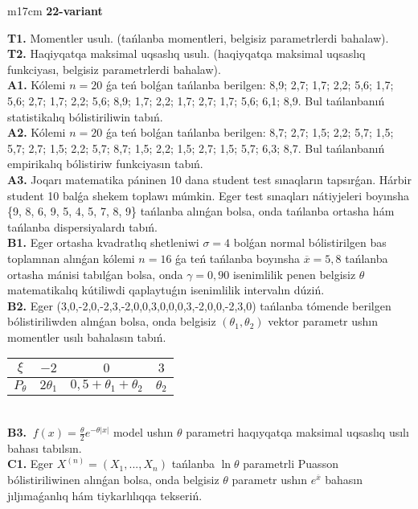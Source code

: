 \documentclass{article}
\begin{document}
\begin{tabular}{m{17cm}}
\textbf{22-variant}
\newline

\textbf{T1.} 
Momentler usulı. (tańlanba momentleri, belgisiz parametrlerdi bahalaw).
 \\
\textbf{T2.} 
Haqiyqatqa maksimal uqsaslıq usulı. (haqiyqatqa maksimal uqsaslıq funkciyası, belgisiz parametrlerdi bahalaw).
 \\
\textbf{A1.} 
Kólemi \(n = 20\) ǵa teń bolǵan tańlanba berilgen: 8,9; 2,7; 1,7; 2,2; 5,6; 1,7; 5,6; 2,7; 1,7; 2,2; 5,6; 8,9; 1,7; 2,2; 1,7; 2,7; 1,7; 5,6; 6,1; 8,9. Bul tańlanbanıń statistikalıq bólistiriliwin tabıń.
 \\
\textbf{A2.} 
Kólemi \(n = 20\) ǵa teń bolǵan tańlanba berilgen: 8,7; 2,7; 1,5; 2,2; 5,7; 1,5; 5,7; 2,7; 1,5; 2,2; 5,7; 8,7; 1,5; 2,2; 1,5; 2,7; 1,5; 5,7; 6,3; 8,7. Bul tańlanbanıń empirikalıq bólistiriw funkciyasın tabıń.
 \\
\textbf{A3.} 
Joqarı matematika páninen 10 dana student test sınaqların tapsırǵan. Hárbir student 10 balǵa shekem toplawı múmkin. Eger test sınaqları nátiyjeleri boyınsha \{9, 8, 6, 9, 5, 4, 5, 7, 8, 9\} tańlanba alınǵan bolsa, onda tańlanba ortasha hám tańlanba dispersiyalardı tabıń.
 \\
\textbf{B1.} 
Eger ortasha kvadratlıq shetleniwi \(\sigma = 4\) bolǵan normal bólistirilgen bas toplamnan alınǵan kólemi \(n = 16\) ǵa teń tańlanba boyınsha \(\overline{x} = 5,8\) tańlanba ortasha mánisi tabılǵan bolsa, onda \(\gamma = 0,90\) isenimlilik penen belgisiz \(\theta\) matematikalıq kútiliwdi qaplaytuǵın isenimlilik intervalın dúziń.
 \\
\textbf{B2.} 
Eger (3,0,-2,0,-2,3,-2,0,0,3,0,0,0,3,-2,0,0,-2,3,0) tańlanba tómende berilgen bólistiriliwden alınǵan bolsa, onda belgisiz \(\left( \theta_{1},\theta_{2} \right)\) vektor parametr ushın momentler usılı bahalasın tabıń.
\begin{tabular}{|c|c|c|c|}
  \hline
$\xi$ &
$- 2$ &
$0$ &
$3$\\
\hline
\(P_{\theta}\) & \({2\theta}_{1}\) & \(0,5 + \theta_{1} + \theta_{2}\) & \(\theta_{2}\) \\
\hline
\end{tabular}
 \\
\textbf{B3.} 
\(\ f(x) = \frac{\theta}{2}e^{- \theta|x|}\) model ushın \(\theta\) parametri haqıyqatqa maksimal uqsaslıq usılı bahası tabılsın.
 \\
\textbf{C1.} 
Eger \(X^{(n)} = \left( X_{1},...,X_{n} \right)\) tańlanba \(\ln\theta\) parametrli Puasson bólistiriliwinen alınǵan bolsa, onda belgisiz \(\theta\) parametr ushın \(e^{\overline{x}}\) bahasın jıljımaǵanlıq hám tiykarlılıqqa tekseriń.

\end{tabular}
\end{document}
